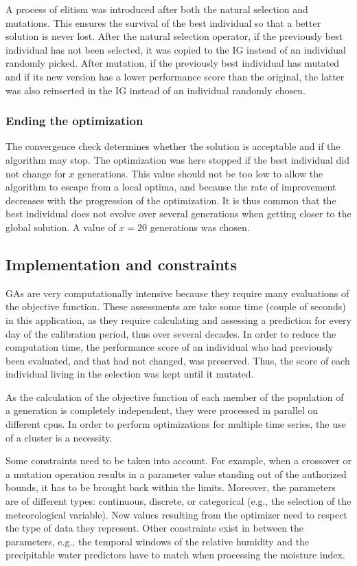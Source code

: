 \documentclass{ametsoc}
\begin{document}
A process of elitism was introduced after both the natural selection and mutations. This ensures the survival of the best individual so that a better solution is never lost. After the natural selection operator, if the previously best individual has not been selected, it was copied to the IG instead of an individual randomly picked. After mutation, if the previously best individual has mutated and if its new version has a lower performance score than the original, the latter was also reinserted in the IG instead of an individual randomly chosen.


\subsubsection{Ending the optimization}

The convergence check determines whether the solution is acceptable and if the algorithm may stop. The optimization was here stopped if the best individual did not change for $x$ generations. This value should not be too low to allow the algorithm to escape from a local optima, and because the rate of improvement decreases with the progression of the optimization. It is thus common that the best individual does not evolve over several generations when getting closer to the global solution. A value of $x=20$ generations was chosen.


\subsection{Implementation and constraints}

GAs are very computationally intensive because they require many evaluations of the objective function. These assessments are take some time (couple of seconds) in this application, as they require calculating and assessing a prediction for every day of the calibration period, thus over several decades. In order to reduce the computation time, the performance score of an individual who had previously been evaluated, and that had not changed, was preserved. Thus, the score of each individual living in the selection was kept until it mutated.

As the calculation of the objective function of each member of the population of a generation is completely independent, they were processed in parallel on different cpus. In order to perform optimizations for multiple time series, the use of a cluster is a necessity.

Some constraints need to be taken into account. For example, when a crossover or a mutation operation results in a parameter value standing out of the authorized bounds, it has to be brought back within the limits. Moreover, the parameters are of different types: continuous, discrete, or categorical (e.g., the selection of the meteorological variable). New values resulting from the optimizer need to respect the type of data they represent. Other constraints exist in between the parameters, e.g., the temporal windows of the relative humidity and the precipitable water predictors have to match when processing the moisture index.
\end{document}
